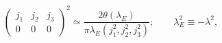 \begin{equation}
 \left(\!\!
 \begin{array}{ccc}j_1\!&\!j_2\!&\!j_3\\ 0\!&\!0\!&\!0\end{array}\!\!\right)^2
 \simeq \frac{2\theta(\lambda_E)}{\pi\lambda_E(j_1^2,j_2^2,j_3^2)};
 \qquad \lambda_E^2\equiv -\lambda^2,
\end{equation}

